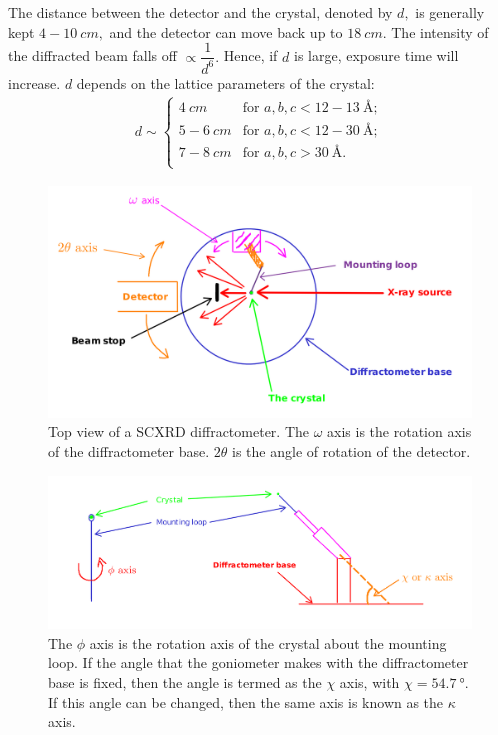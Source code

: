 The distance between the detector and the crystal, denoted by $d,$ is generally kept $4-10~\si{cm},$ and the detector can move back up to $\SI{18}{cm}.$ The intensity of the diffracted beam falls off $\propto \dfrac{1}{d^6}.$ Hence, if $d$ is large, exposure time will increase. $d$ depends on the lattice parameters of the crystal:%
%	
	\begin{subequations}
		\begin{align}
		d \sim \begin{cases}
		\SI{4}{cm} & \text{for } a, b, c < 12-13~\si{\angstrom};\\
		5-6~\si{cm} & \text{for } a, b, c < 12-30~\si{\angstrom};\\
		7-8~\si{cm} & \text{for } a, b, c > \SI{30}{\angstrom}.\\
		\end{cases}
		\end{align}
	\end{subequations}
	
\begin{figure}
	\centering
	\includegraphics[scale=0.2]{sc_diffractometer_omega.png}
	\caption{\label{diffractometer_omega}Top view of a SCXRD diffractometer. The $\omega$ axis is the rotation axis of the diffractometer base. $2\theta$ is the angle of rotation of the detector.}
\end{figure}
	
\begin{figure}
	\centering
	\includegraphics[width=\textwidth]{sc_diffractometer_phi_chi.png}
	\caption{\label{diffractometer_phi_chi}The $\phi$ axis is the rotation axis of the crystal about the mounting loop. If the angle that the goniometer makes with the diffractometer base is fixed, then the angle is termed as the $\chi$ axis, with $\chi = \SI{54.7}{\degree}.$ If this angle can be changed, then the same axis is known as the $\kappa$ axis.}
\end{figure}

